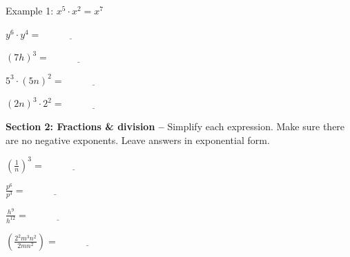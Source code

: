 \documentclass[12pt]{article}
\begin{document}
Example 1: $x^5 \cdot x^2=x^7$\\

\begin{enumerate}
\begin{multicols}{2}

	\item $ y^6 \cdot y^4 =\underline{\hspace{1in}}$\\
	
	\item $(7h)^3=\underline{\hspace{1in}}$\\
	
	\item $ 5^{3} \cdot (5n)^2=\underline{\hspace{1in}}$\\
	
	\item $ (2n)^{3} \cdot 2^2 = \underline{\hspace{1in}}$\\

\end{multicols}
\end{enumerate}


\hrulefill

\textbf{Section 2: Fractions \& division -- } Simplify each expression. Make sure there are no negative exponents. Leave answers in exponential form.\\ 

\begin{enumerate}[resume]
\begin{multicols}{2}

	\item $\left(\frac{1}{n}\right)^{3}=\underline{\hspace{1in}}$\\
	
	\item $\frac{p^6}{p^3}=\underline{\hspace{1in}}$\\
	
	\item $\frac{h^9}{h^{12}}=\underline{\hspace{1in}}$\\
	
	\item $\left(\frac{2^2m^3n^{2}}{2mn^2}\right)=\underline{\hspace{1in}}$\\

\end{multicols}
\end{enumerate}
\end{document}

